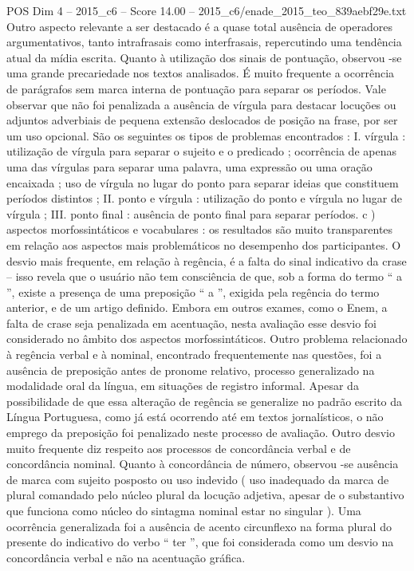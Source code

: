 \begin{textsample}{POS Dim 4 – 2015\_c6 – Score 14.00 – 2015\_c6/enade\_2015\_teo\_839aebf29e.txt}
Outro aspecto relevante a ser destacado é a quase total ausência de operadores argumentativos, tanto intrafrasais como interfrasais, repercutindo uma tendência atual da mídia escrita.
Quanto à utilização dos sinais de pontuação, observou -se uma grande precariedade nos textos analisados.
É muito frequente a ocorrência de parágrafos sem marca interna de pontuação para separar os períodos.
Vale observar que não foi penalizada a ausência de vírgula para destacar locuções ou adjuntos adverbiais de pequena extensão deslocados de posição na frase, por ser um uso opcional.
São os seguintes os tipos de problemas encontrados : I. vírgula : utilização de vírgula para separar o sujeito e o predicado ; ocorrência de apenas uma das vírgulas para separar uma palavra, uma expressão ou uma oração encaixada ; uso de vírgula no lugar do ponto para separar ideias que constituem períodos distintos ; II. ponto e vírgula : utilização do ponto e vírgula no lugar de vírgula ; III. ponto final : ausência de ponto final para separar períodos. c ) aspectos morfossintáticos e vocabulares : os resultados são muito transparentes em relação aos aspectos mais problemáticos no desempenho dos participantes.
O desvio mais frequente, em relação à regência, é a falta do sinal indicativo da crase – isso revela que o usuário não tem consciência de que, sob a forma do termo “ a ”, existe a presença de uma preposição “ a ”, exigida pela regência do termo anterior, e de um artigo definido.
Embora em outros exames, como o Enem, a falta de crase seja penalizada em acentuação, nesta avaliação esse desvio foi considerado no âmbito dos aspectos morfossintáticos.
Outro problema relacionado à regência verbal e à nominal, encontrado frequentemente nas questões, foi a ausência de preposição antes de pronome relativo, processo generalizado na modalidade oral da língua, em situações de registro informal.
Apesar da possibilidade de que essa alteração de regência se generalize no padrão escrito da Língua Portuguesa, como já está ocorrendo até em textos jornalísticos, o não emprego da preposição foi penalizado neste processo de avaliação.
Outro desvio muito frequente diz respeito aos processos de concordância verbal e de concordância nominal.
Quanto à concordância de número, observou -se ausência de marca com sujeito posposto ou uso indevido ( uso inadequado da marca de plural comandado pelo núcleo plural da locução adjetiva, apesar de o substantivo que funciona como núcleo do sintagma nominal estar no singular ).
Uma ocorrência generalizada foi a ausência de acento circunflexo na forma plural do presente do indicativo do verbo “ ter ”, que foi considerada como um desvio na concordância verbal e não na acentuação gráfica.

\end{textsample}
